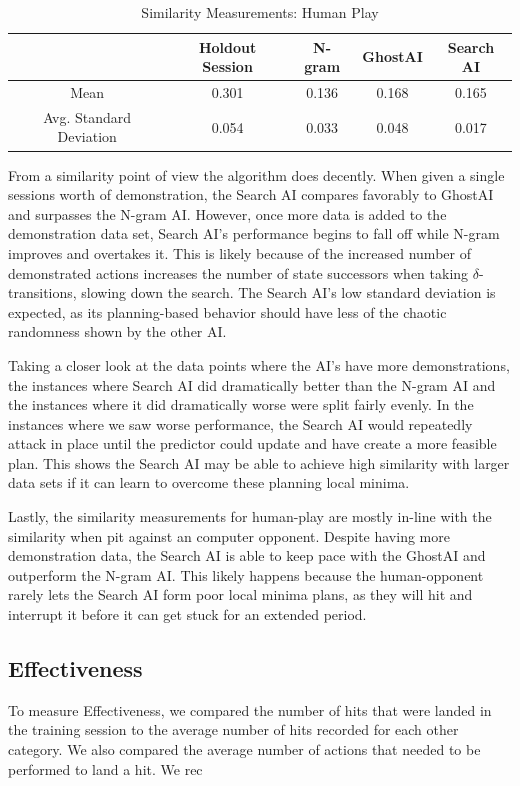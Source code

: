 \begin{table}[h]
	\centering
	\caption{ Similarity Measurements: Human Play }
	\begin{tabular}	{| c | c | c | c | c |}
		\hline
		& Holdout Session & N-gram & GhostAI & Search AI \\
		\hline
		Mean &
		0.301 &
		0.136 &
		0.168 &
		0.165\\
		\hline
		Avg. Standard Deviation & 
		0.054 &
		0.033 &
		0.048 &
		0.017\\
		\hline
	\end{tabular}
	\label{Similarity}
\end{table}

From a similarity point of view the algorithm does decently. When given a single sessions worth of demonstration, the Search AI compares favorably to GhostAI and surpasses the N-gram AI. However, once more data is added to the demonstration data set, Search AI's performance begins to fall off while N-gram improves and overtakes it. This is likely because of the increased number of demonstrated actions increases the number of state successors when taking $\delta$-transitions, slowing down the search. The Search AI's low standard deviation is expected, as its planning-based behavior should have less of the chaotic randomness shown by the other AI.

Taking a closer look at the data points where the AI's have more demonstrations, the instances where Search AI did dramatically better than the N-gram AI and the instances where it did dramatically worse were split fairly evenly. In the instances where we saw worse performance, the Search AI would repeatedly attack in place until the predictor could update and have create a more feasible plan. This shows the Search AI may be able to achieve high similarity with larger data sets if it can learn to overcome these planning local minima. 

Lastly, the similarity measurements for human-play are mostly in-line with the similarity when pit against an computer opponent. Despite having more demonstration data, the Search AI is able to keep pace with the GhostAI and outperform the N-gram AI. This likely happens because the human-opponent rarely lets the Search AI form poor local minima plans, as they will hit and interrupt it before it can get stuck for an extended period.

\subsection{Effectiveness}
To measure Effectiveness, we compared the number of hits that were landed in the training session to the average number of hits recorded for each other category. We also compared the average number of actions that needed to be performed to land a hit. We rec

